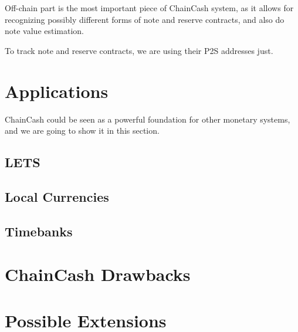 \documentclass{article}   %
\newcommand{\cc}{ChainCash}
\begin{document}
Off-chain part is the most important piece of \cc{} system, as it allows for recognizing possibly different forms of note and reserve contracts, and also do note value estimation. 

To track note and reserve contracts, we are using their P2S addresses just. 

\section{Applications}

\cc{} could be seen as a powerful foundation for other monetary systems, and we are going to show it in this section. 

\subsection{LETS}

\subsection{Local Currencies}

\subsection{Timebanks}

\section{\cc{} Drawbacks}

\section{Possible Extensions}


\newpage

 
\end{document}
